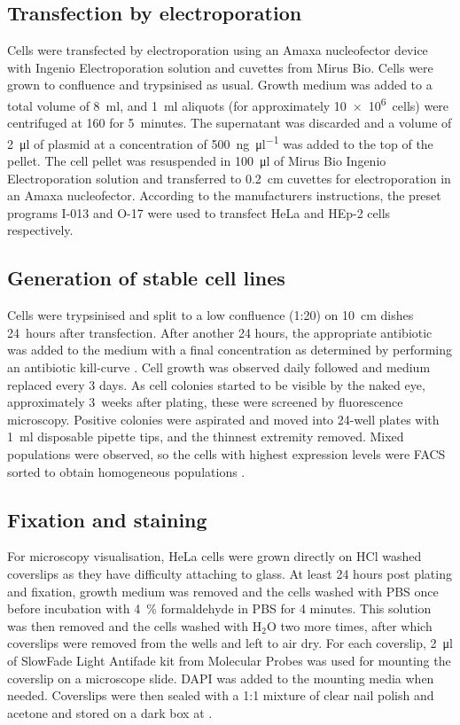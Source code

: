     \subsection{Transfection by electroporation}
      Cells were transfected by electroporation using an Amaxa nucleofector
      device with Ingenio Electroporation solution and cuvettes from Mirus Bio.
      Cells were grown to confluence and trypsinised as usual. Growth medium was
      added to a total volume of \SI{8}{\ml}, and \SI{1}{\ml} aliquots (for
      approximately \SI{10e6}{cells}) were centrifuged at \SI{160}{\gn} for 5~minutes.
      The supernatant was discarded and a volume of \SI{2}{\ul} of plasmid at
      a concentration of \SI{500}{\ng\per\ul} was added to the top of the pellet.
      The cell pellet was resuspended in \SI{100}{\ul} of Mirus Bio Ingenio
      Electroporation solution and transferred to \SI{0.2}{\cm} cuvettes for
      electroporation in an Amaxa nucleofector. According to the manufacturers
      instructions, the preset programs I-013 and O-17 were used to transfect
      HeLa and HEp-2 cells respectively.

    \subsection{Generation of stable cell lines}
      Cells were trypsinised and split to a low confluence (1:20) on
      \SI{10}{\cm} dishes 24~hours after transfection.  After another
      24 hours, the appropriate antibiotic was added to the medium
      with a final concentration as determined by performing an
      antibiotic kill-curve .  Cell
      growth was observed daily followed and medium replaced every 3
      days.  As cell colonies started to be visible by the naked eye,
      approximately 3~weeks after plating, these were screened by
      fluorescence microscopy.  Positive colonies were aspirated and
      moved into 24-well plates with \SI{1}{\ml} disposable pipette
      tips, and the thinnest extremity removed.  Mixed populations
      were observed, so the cells with highest expression levels were
      FACS sorted to obtain homogeneous populations
      .

    \subsection{Fixation and staining}
      For microscopy visualisation, HeLa cells were grown directly
      on HCl washed coverslips as they
      have difficulty attaching to glass. At least 24 hours post
      plating and fixation, growth medium was removed and the cells
      washed with PBS once before incubation with \SI{4}{\percent} formaldehyde in PBS
      for 4 minutes. This solution was then removed
      and the cells washed with H$_2$O two more
      times, after which coverslips were removed from the wells and left to air dry.
      For each coverslip, \SI{2}{\ul} of SlowFade Light Antifade kit from Molecular Probes
      was used for mounting the coverslip on a microscope slide. DAPI was added
      to the mounting media when needed. Coverslips were then sealed with a 1:1
      mixture of clear nail polish and acetone and stored on a dark box at .

